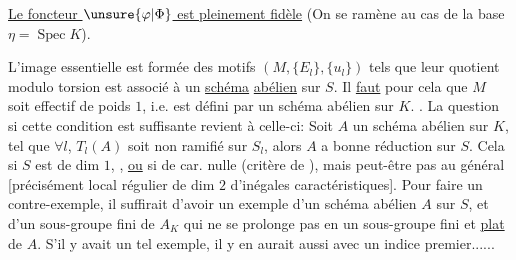 
\uline{Le foncteur \(\unsure{\varphi|\Phi}\) est pleinement fidèle}
(On se ramène au cas de la base \(\eta=\operatorname{Spec}K\)).

L'image essentielle est 
formée des motifs \((M,\{E_l\},\{u_l\})\) tels que
 leur quotient modulo
torsion est associé à un \uline{schéma} \uline{abélien} sur \(S\).
Il \uline{faut} pour cela que \(M\) soit effectif de poids \(1\),
i.e. est défini par un schéma abélien  sur \(K\).
 .
La question si cette condition est suffisante revient à
celle-ci: Soit \(A\) un schéma abélien sur \(K\),  tel
que \(\forall l\),  \(T_l(A)\) soit non ramifié sur \(S_l\), alors
\(A\) a bonne réduction sur \(S\). Cela  si
\(S\) est de dim \(1\), ,
\uline{ou} si de car. nulle (critère de
), mais peut-être pas au général [précisément
local régulier de dim \(2\) d'inégales caractéristiques]. Pour
faire un contre-exemple, il suffirait d'avoir un exemple
d'un schéma abélien \(A\) sur \(S\), et d'un sous-groupe fini de
\(A_K\) qui ne se prolonge pas en un sous-groupe fini et \uline{plat}
de \(A\). S'il y avait un tel exemple, il y en aurait
aussi avec un indice premier......

